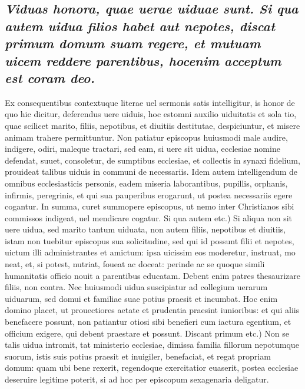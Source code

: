 \documentclass{article}
\begin{document}
\begin{pages}
\subsection*{\textit{Viduas honora, quae uerae uiduae sunt. Si qua autem uidua filios habet aut nepotes, discat primum domum suam regere, et mutuam uicem reddere parentibus, hocenim acceptum est coram deo. }}\pstart Ex consequentibus contextuque literae uel sermonis satis intelligitur, is honor de quo hic dicitur, deferendus uere uiduis, hoc estomni auxilio uiduitatis et sola tio, quae scilicet marito, filiis, nepotibus, et diuitiis destitutae, despiciuntur, et misere animam trahere permittuntur. Non patiatur episcopus huiusmodi male audire, indigere, odiri, maleque tractari, sed eam, si uere sit uidua, ecclesiae nomine defendat, suuet, consoletur, de sumptibus ecclesiae, et collectis in synaxi fidelium, prouideat talibus uiduis in communi de necessariis. Idem autem intelligendum de omnibus ecclesiasticis personis, eadem miseria laborantibus, pupillis, orphanis, infirmis, peregrinis, et qui sua pauperibus erogarunt, ut postea necessariis egere cogantur. In summa, curet summopere episcopus, ut nemo inter Christianos sibi commissos indigeat, uel mendicare cogatur. Si qua autem etc.) Si aliqua non sit uere uidua, sed marito tantum uiduata, non autem filiis, nepotibus et diuitiis, istam non tuebitur episcopus sua solicitudine, sed qui id possunt filii et nepotes, uictum illi administrantes et amictum: ipsa uicissim eos moderetur, instruat, mo neat, et, si potest, nutriat, foueat ac doceat: perinde ac se quoque simili humanitatis officio nouit a parentibus educatam. Debent enim patres thesaurizare filiis, non contra. Nec huiusmodi uidua suscipiatur ad collegium uerarum uiduarum, sed domui et familiae suae potius praesit et incumbat. Hoc enim domino placet, ut prouectiores aetate et prudentia praesint iunioribus: et qui aliis benefacere possunt, non patiantur otiosi sibi benefieri cum iactura egentium, et officium exigere, qui debent praestare et possunt. Discant primum etc.) Non se talis uidua intromit, tat ministerio ecclesiae, dimissa familia fillorum nepotumque suorum, istis suis potius praesit et inuigiler, benefaciat, et regat propriam domum: quam ubi bene rexerit, regendoque exercitatior euaserit, postea ecclesiae deseruire legitime poterit, si ad hoc per episcopum sexagenaria deligatur.  \pend
{}
{}

\end{pages}
\end{document}
